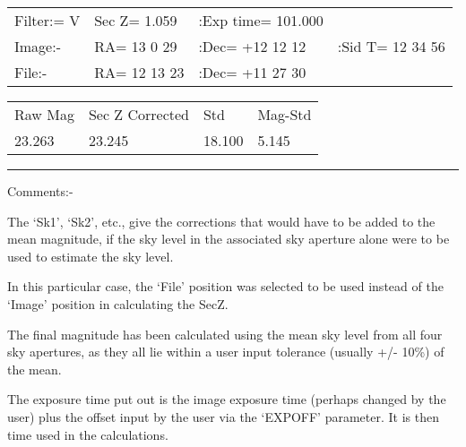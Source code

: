\begin{small}
{{{ 
\hspace{3ex}\begin{tabular}{llll}
  Filter:= V &Sec Z= 1.059  &:Exp time= 101.000 & \\
  Image:-    &RA= 13  0 29  & :Dec= +12 12 12   &:Sid T= 12 34 56 \\
   File:-    &RA= 12 13 23  & :Dec= +11 27 30   & \\
\end{tabular}
 
\hspace{3ex}\begin{tabular}{llll}
  Raw Mag    & Sec Z Corrected    & Std    & Mag-Std \\
      23.263 &   23.245         & 18.100   & 5.145 \\
\end{tabular}
 
\rule{5in}{0.2mm}
 
  Comments:-
 
\begin{list}{{-}}{}
    \item The `Sk1', `Sk2', etc., give the corrections that would have to be
      added to the mean magnitude, if the sky level in the associated
      sky aperture alone were to be used to estimate the sky level.
    \item  In this particular case, the `File' position was selected to be
      used instead of the `Image' position in calculating the SecZ.
    \item  The final magnitude has been calculated using the mean sky
      level from all four sky apertures, as they all lie within a user
      input tolerance (usually +/- 10\%) of the mean.
    \item  The exposure time put out is the image exposure time (perhaps
      changed by the user) plus the offset input by the user via the
      `EXPOFF' parameter. It is then time used in the calculations.
\end{list}
 
}}}
\end{small}
